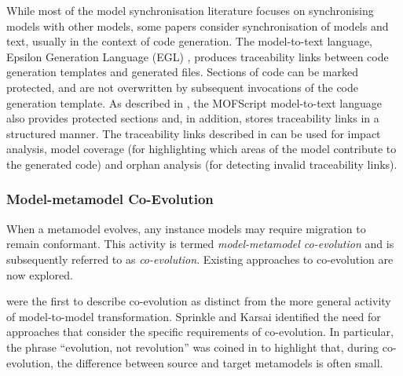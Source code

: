 While most of the model synchronisation literature focuses on synchronising models with other models, some papers consider synchronisation of models and text, usually in the context of code generation. The model-to-text language, Epsilon Generation Language (EGL) \cite{rose08egl}, produces traceability links between code generation templates and generated files. Sections of code can be marked protected, and are not overwritten by subsequent invocations of the code generation template. As described in \cite{olsen07traceability}, the MOFScript model-to-text language also provides protected sections and, in addition, stores traceability links in a structured manner. The traceability links described in \cite{olsen07traceability} can be used for impact analysis, model coverage (for highlighting which areas of the model contribute to the generated code) and orphan analysis (for detecting invalid traceability links).


\subsubsection{Model-metamodel Co-Evolution}
\label{LitReview:ModelCoEvo}
When a metamodel evolves, any instance models may require migration to remain conformant. This activity is termed \textit{model-metamodel co-evolution} and is subsequently referred to as \emph{co-evolution}. Existing approaches to co-evolution are now explored.

\cite{sprinkle04domain} were the first to describe co-evolution as distinct from the more general activity of model-to-model transformation. Sprinkle and Karsai identified the need for approaches that consider the specific requirements of co-evolution. In particular, the phrase ``evolution, not revolution'' was coined in \cite{sprinkle03thesis} to highlight that, during co-evolution, the difference between source and target metamodels is often small.

